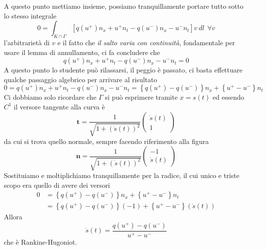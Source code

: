 \documentclass[10pt,a4paper,twoside,openright]{book}
\begin{document}
\begin{dimostrazione}
	A questo punto mettiamo insieme, possiamo tranquillamente portare tutto sotto lo stesso integrale
	\begin{equation*}
		0=\int _{K\cap \Gamma }\left[ q\left( u^{+}\right) n_{x} +u^{+} n_{t} -q\left( u^{-}\right) n_{x} -u^{-} n_{t}\right] v\ dl\ \ \forall v
	\end{equation*}
	l'arbitrarietà di $v$ e il fatto che \emph{il salto varia con continuità}, fondamentale per usare il lemma di annullamento, ci fa concludere che
	\begin{equation*}
		q\left( u^{+}\right) n_{x} +u^{+} n_{t} -q\left( u^{-}\right) n_{x} -u^{-} n_{t} =0
	\end{equation*}
	A questo punto lo studente può rilassarsi, il peggio è passato, ci basta effettuare qualche passaggio algebrico per arrivare al risultato
	\begin{equation*}
		0=q\left( u^{+}\right) n_{x} +u^{+} n_{t} -q\left( u^{-}\right) n_{x} -u^{-} n_{t} =\left\{q\left( u^{+}\right) -q\left( u^{-}\right)\right\} n_{x} +\left\{u^{+} -u^{-}\right\} n_{t}
	\end{equation*}
	Ci dobbiamo solo ricordare che $\Gamma $ si può esprimere tramite $x=s( t)$ ed essendo $C^{1}$ il versore tangente alla curva è
	\begin{equation*}
		\mathbf{t} =\frac{1}{\sqrt{1+(\dot{s}( t))^{2}}}
		\begin{pmatrix}
			\dot{s}( t) \\
			1           
		\end{pmatrix}
	\end{equation*}
	da cui si trova quello normale, sempre facendo riferimento alla figura
	\begin{equation*}
		\mathbf{n} =\frac{1}{\sqrt{1+(\dot{s}( t))^{2}}}
		\begin{pmatrix}
			-1          \\
			\dot{s}( t) 
		\end{pmatrix}
	\end{equation*}
	Sostituiamo e moltiplichiamo tranquillamente per la radice, il cui unico e triste scopo era quello di avere dei versori
	\begin{align*}
		0 & =\left\{q\left( u^{+}\right) -q\left( u^{-}\right)\right\} n_{x} +\left\{u^{+} -u^{-}\right\} n_{t}       \\
		  & =\left\{q\left( u^{+}\right) -q\left( u^{-}\right)\right\}( -1) +\left\{u^{+} -u^{-}\right\}(\dot{s}( t)) 
	\end{align*}
	Allora
	\begin{equation*}
		\dot{s}( t) =\frac{q\left( u^{+}\right) -q\left( u^{-}\right)}{u^{+} -u^{-}}
	\end{equation*}
	che è Rankine-Hugoniot.
\end{dimostrazione}
\end{document}
